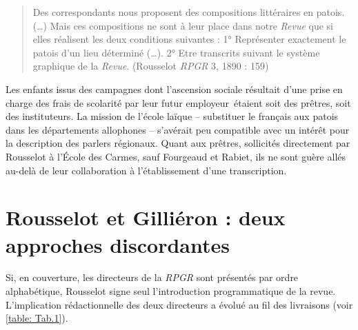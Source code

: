 \documentclass[output=paper]{langsci/langscibook}
\begin{document}
\begin{quote}
    Des correspondants nous proposent des compositions littéraires en patois. (…) Mais ces compositions ne sont à leur place dans notre \textit{Revue} que si elles réalisent les deux conditions suivantes : 1° Représenter exactement le patois d’un lieu déterminé (…). 2° Etre transcrits suivant le système graphique de la \textit{Revue}. (Rousselot \textit{RPGR} 3, 1890 : 159)
\end{quote}

Les enfants issus des campagnes dont l’ascension sociale résultait d’une prise en charge des frais de scolarité par leur futur employeur~étaient soit des prêtres, soit des instituteurs. La mission de l’école laïque – substituer le français aux patois dans les départements allophones – s’avérait peu compatible avec un intérêt pour la description des parlers régionaux. Quant aux prêtres, sollicités directement par Rousselot à l’École des Carmes, sauf Fourgeaud et Rabiet, ils ne sont guère allés au-delà de leur collaboration à l’établissement d’une transcription. 

\section{Rousselot et Gilliéron : deux approches discordantes}

Si, en couverture, les directeurs de la \textit{RPGR} sont présentés par ordre alphabétique, Rousselot signe seul l’introduction programmatique de la revue. L’implication rédactionnelle des deux directeurs a évolué au fil des livraisons (voir \ref{table: Tab.1}). \\
\end{document}
